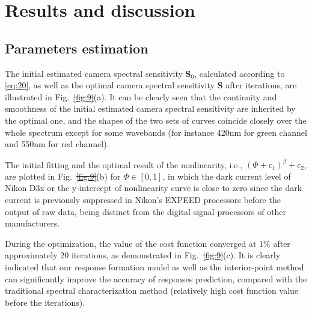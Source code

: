 \documentclass[9pt,twocolumn,twoside]{osajnl}
\providecommand{\DIFadd}[1]{{\protect\color{blue}\uwave{#1}}} %
\providecommand{\DIFdel}[1]{{\protect\color{red}\sout{#1}}}                      %
\providecommand{\DIFaddbegin}{} %
\providecommand{\DIFaddend}{} %
\providecommand{\DIFdelbegin}{} %
\providecommand{\DIFdelend}{} %
\begin{document}
\section{Results and discussion}\label{sec:results and discussion}

\subsection{Parameters estimation}\label{sec:parameters estimation}

The initial estimated camera spectral sensitivity $\mathbf{S}_0$, calculated according to \eqref{eq:20}, as well as the optimal camera spectral sensitivity $\mathbf{S}$ after iterations, are illustrated in Fig.~\DIFdelbegin \DIFdel{\ref{fig:9}}\DIFdelend \DIFaddbegin \DIFadd{\ref{fig:10}}\DIFaddend (a). It can be clearly seen that the continuity and smoothness of the initial estimated camera spectral sensitivity are inherited by the optimal one, and the shapes of the two sets of curves coincide closely over the whole spectrum except for some wavebands (for instance 420nm for green channel and 550nm for red channel).

The initial fitting and the optimal result of the nonlinearity, i.e., $(\Phi + c_1)^\beta + c_2$, are plotted in Fig.~\DIFdelbegin \DIFdel{\ref{fig:9}}\DIFdelend \DIFaddbegin \DIFadd{\ref{fig:10}}\DIFaddend (b) for $\Phi\in[0, 1]$, in which the dark current level of Nikon D3x or the y-intercept of nonlinearity curve is close to zero since the dark current is previously suppressed in Nikon’s EXPEED processors before the output of raw data, being distinct from the digital signal processors of other manufacturers.

During the optimization, the value of the cost function converged at 1\% after approximately 20 iterations, as demonstrated in Fig.~\DIFdelbegin \DIFdel{\ref{fig:9}}\DIFdelend \DIFaddbegin \DIFadd{\ref{fig:10}}\DIFaddend (c). It is clearly indicated that our response formation model as well as the interior-point method can significantly improve the accuracy of responses prediction, compared with the traditional spectral characterization method (relatively high cost function value before the iterations).
\end{document}
